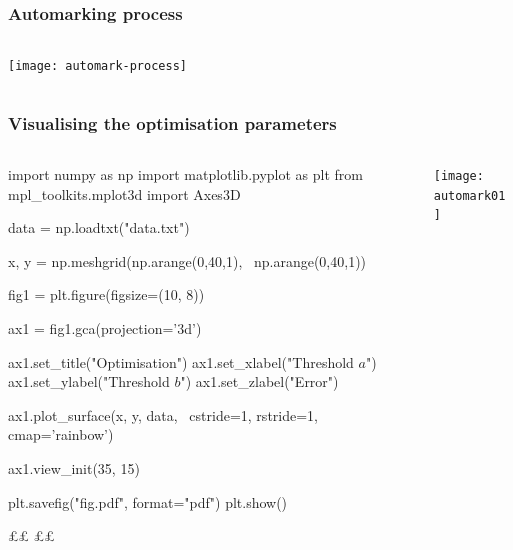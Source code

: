 \documentclass[handout, notes=hide]{beamer}
\begin{document}

\begin{frame}[fragile]
\frametitle{Automarking process}
\setlength{\parskip}{0.5em}

\begin{columns}[T]
\begin{column}[T]{1.0\textwidth}
\vspace{-0.75em}

\texttt{[image: automark-process]}

\end{column}
\end{columns}


\end{frame}
\note{
\setlength{\parskip}{0.5em}
}


\begin{frame}[fragile]
\frametitle{Visualising the optimisation parameters}
\setlength{\parskip}{0.5em}

\begin{columns}[T]
\begin{column}[T]{0.5\textwidth}
\setlength{\parskip}{0.7em}

\begin{python}
import numpy as np
import matplotlib.pyplot as plt
from mpl_toolkits.mplot3d import Axes3D

data = np.loadtxt("data.txt")

x, y = np.meshgrid(np.arange(0,40,1), \
                   np.arange(0,40,1))

fig1 = plt.figure(figsize=(10, 8))

ax1 = fig1.gca(projection='3d')

ax1.set_title("Optimisation")
ax1.set_xlabel("Threshold $a$")
ax1.set_ylabel("Threshold $b$")
ax1.set_zlabel("Error")

ax1.plot_surface(x, y, data, \
  cstride=1, rstride=1, cmap='rainbow')

ax1.view_init(35, 15)

plt.savefig("fig.pdf", format="pdf")
plt.show()


££  ££
\end{python}

\end{column}
\begin{column}[T]{0.5\textwidth}
\vspace{2.5em}

\texttt{[image: automark01]}
\end{column}
\end{columns}


\end{frame}
\note{
\setlength{\parskip}{0.5em}
}
\end{document}
